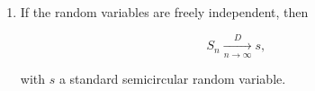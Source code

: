 \begin{theorem}
\begin{enumerate}
            
            \item If the random variables are freely independent, then 
                
            \begin{equation*}
            S_n \xrightarrow[n\to\infty]{D} s,        
            \end{equation*}

            \noindent with $s$ a standard semicircular random variable.
        \end{enumerate}
    \end{theorem}

